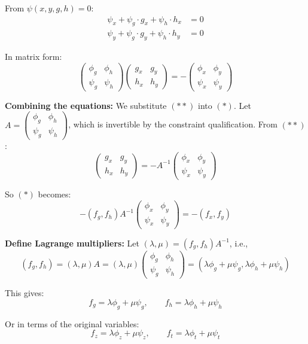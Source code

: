 \documentclass[11pt]{report}
\begin{document}
From $\psi(x, y, g, h) = 0$:
\begin{align*}
\psi_x + \psi_g \cdot g_x + \psi_h \cdot h_x &= 0 \\
\psi_y + \psi_g \cdot g_y + \psi_h \cdot h_y &= 0
\end{align*}

In matrix form:
\[
\begin{pmatrix} \phi_g & \phi_h \\ \psi_g & \psi_h \end{pmatrix} \begin{pmatrix} g_x & g_y \\ h_x & h_y \end{pmatrix} = -\begin{pmatrix} \phi_x & \phi_y \\ \psi_x & \psi_y \end{pmatrix} \tag{$**$}
\]

\textbf{Combining the equations:} We substitute $(**)$ into $(*)$. Let $A = \begin{pmatrix} \phi_g & \phi_h \\ \psi_g & \psi_h \end{pmatrix}$, which is invertible by the constraint qualification. From $(**)$:
\[
\begin{pmatrix} g_x & g_y \\ h_x & h_y \end{pmatrix} = -A^{-1} \begin{pmatrix} \phi_x & \phi_y \\ \psi_x & \psi_y \end{pmatrix}
\]

So $(*)$ becomes:
\[
-(f_g, f_h) A^{-1} \begin{pmatrix} \phi_x & \phi_y \\ \psi_x & \psi_y \end{pmatrix} = -(f_x, f_y)
\]

\textbf{Define Lagrange multipliers:} Let $(\lambda, \mu) = (f_g, f_h) A^{-1}$, i.e.,
\[
(f_g, f_h) = (\lambda, \mu) A = (\lambda, \mu) \begin{pmatrix} \phi_g & \phi_h \\ \psi_g & \psi_h \end{pmatrix} = (\lambda \phi_g + \mu \psi_g, \lambda \phi_h + \mu \psi_h)
\]

This gives:
\[
f_g = \lambda \phi_g + \mu \psi_g, \qquad f_h = \lambda \phi_h + \mu \psi_h \tag{I}
\]

Or in terms of the original variables:
\[
f_z = \lambda \phi_z + \mu \psi_z, \qquad f_t = \lambda \phi_t + \mu \psi_t
\]
\end{document}
